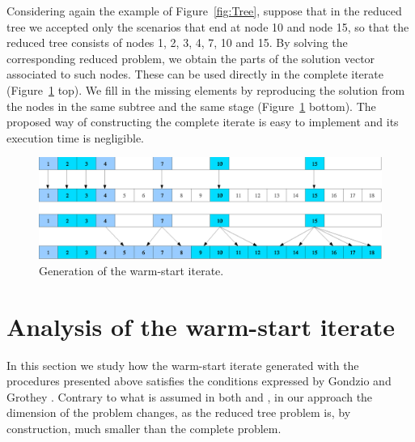 Considering again the example of Figure~\ref{fig:Tree}, suppose that 
in the reduced tree we accepted only the scenarios that end at 
node 10 and node 15, so that the reduced tree consists of nodes 
1, 2, 3, 4, 7, 10 and 15. By solving the corresponding reduced problem, 
we obtain the parts of the solution vector associated to such 
nodes. These can be used directly in the complete iterate
(Figure~\ref{fig:Solution} top). 
We fill in the missing elements 
by reproducing the solution from the nodes in the same subtree 
and the same stage (Figure~\ref{fig:Solution} bottom).
The proposed way of constructing the complete iterate is easy to
implement and its execution time is negligible.
%
\begin{figure}[ht]
  \begin{center}
    \includegraphics[scale=.51]{figures/solution.eps}
    \caption{Generation of the warm-start iterate.}
    \label{fig:Solution}
  \end{center}
  \vspace{-3ex}
\end{figure}


%
%
\section{Analysis of the warm-start iterate}
\label{sec:Analysis}

In this section we study how the warm-start iterate generated with 
the procedures presented above satisfies the conditions expressed by 
Gondzio and Grothey \cite{GondzioGrothey03}. 
Contrary to what is assumed in both \cite{YildirimWright} and 
\cite{GondzioGrothey03}, in our approach the dimension of the problem changes, 
as the reduced tree problem is, by construction, much smaller than the 
complete problem.

